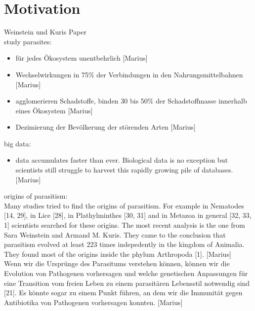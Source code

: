   \section{Motivation}
    Weinstein und Kuris Paper \cite{Weinstein2016} \\
    study parasites:
    \begin{itemize}
      \item für jedes Ökosystem unentbehrlich [Marius]
      \item Wechselwirkungen in 75\% der Verbindungen in den Nahrungsmittelbahnen [Marius]
      \item agglomerieren Schadstoffe, binden 30 bis 50\% der Schadstoffmasse innerhalb eines Ökosystem [Marius]
      \item Dezimierung der Bevölkerung der störenden Arten [Marius]
    \end{itemize}
    big data:
    \begin{itemize}
      \item data accumulates faster than ever. Biological data is no exception but scientists still struggle to harvest this rapidly growing pile of databases. [Marius]      
    \end{itemize}
    origins of parasitism: \\
    Many studies tried to find the origins of parasitism. For example in Nematodes [14, 29], in Lice 
      [28], in Plathylminthes [30, 31] and in Metazoa in general [32, 33, 1] scientists searched for 
      these origins. The most recent analysis is the one from Sara Weinstein and Armand M. Kuris. 
      They came to the conclusion that parasitism evolved at least 223 times indepedently in the 
      kingdom of Animalia. They found most of the origins inside the phylum Arthropoda [1]. [Marius] \\
    Wenn wir die Ursprünge des Parasitums verstehen können, können wir die Evolution von Pathogenen 
      vorhersagen und welche genetischen Anpassungen für eine Transition vom freien Leben zu einem 
      parasitären Lebensstil notwendig sind [21]. Es könnte sogar zu einem Punkt führen, an dem wir 
      die Immunität gegen Antibiotika von Pathogenen vorhersagen konnten. [Marius]


